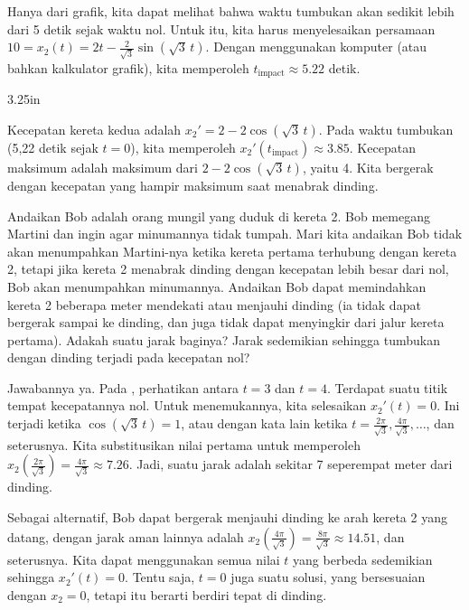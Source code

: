 \begin{example}
Hanya dari grafik, kita dapat melihat bahwa waktu tumbukan akan sedikit
lebih dari 5 detik sejak waktu nol.  Untuk itu, kita harus menyelesaikan
persamaan $10 = x_2(t) = 2 t - \frac{2}{\sqrt{3}} \sin ( \sqrt{3} \,
t)$.
Dengan menggunakan komputer (atau bahkan kalkulator grafik),
kita memperoleh $t_{\text{impact}} \approx 5.22$ detik.

\begin{mywrapfig}{3.25in}
\capstart
{}
\caption{Posisi kereta kedua terhadap waktu (dengan mengabaikan dinding).\label{sosa:railcarfig}}
\end{mywrapfig}


Kecepatan kereta kedua adalah $x_2' = 2 - 2 \cos ( \sqrt{3} \, t)$.
Pada waktu tumbukan (5,22 detik sejak $t=0$), kita memperoleh 
$x_2'(t_{\text{impact}}) \approx 3.85$.
%
Kecepatan maksimum adalah maksimum dari $2 - 2 \cos ( \sqrt{3} \, t )$, yaitu 4.
Kita bergerak dengan kecepatan yang hampir maksimum saat menabrak dinding.

\medskip

Andaikan Bob adalah orang mungil yang duduk di kereta 2.  Bob memegang Martini dan
ingin agar minumannya tidak tumpah.  Mari kita andaikan Bob tidak akan menumpahkan
Martini-nya
ketika kereta pertama terhubung dengan kereta 2, tetapi jika kereta 2 menabrak dinding dengan
kecepatan lebih besar dari nol, Bob akan menumpahkan minumannya.  Andaikan Bob
dapat memindahkan kereta 2
beberapa meter mendekati atau menjauhi dinding (ia tidak dapat bergerak sampai ke
dinding, dan juga tidak dapat menyingkir dari jalur kereta pertama).  Adakah suatu
jarak 
baginya?  Jarak sedemikian sehingga tumbukan dengan
dinding terjadi pada kecepatan nol?

Jawabannya ya.  Pada ,
perhatikan  antara $t=3$ dan $t=4$.  Terdapat suatu titik tempat
kecepatannya nol.  Untuk menemukannya, kita selesaikan $x_2'(t) = 0$.  Ini terjadi ketika
$\cos ( \sqrt{3} \, t) = 1$, atau dengan kata lain ketika $t = \frac{2 \pi}{\sqrt{3}}, 
\frac{4 \pi}{\sqrt{3}},\ldots$, dan seterusnya.  Kita substitusikan nilai pertama untuk memperoleh
$x_2\left(\frac{2 \pi}{\sqrt{3}}\right) = 
\frac{4 \pi}{\sqrt{3}} \approx 7.26$.  Jadi, suatu jarak  adalah sekitar 7 seperempat
meter dari dinding.

Sebagai alternatif, Bob dapat bergerak menjauhi dinding
ke arah kereta 2 yang datang, dengan jarak aman lainnya adalah
$x_2 \left( \frac{4 \pi}{\sqrt{3}} \right) = \frac{8 \pi}{\sqrt{3}}
\approx 14.51$, dan seterusnya.  Kita dapat menggunakan semua nilai
$t$ yang berbeda sedemikian sehingga $x_2'(t) = 0$.  Tentu saja, $t=0$ juga suatu solusi,
yang bersesuaian dengan $x_2 = 0$, tetapi
itu berarti berdiri tepat di dinding.
\end{example}

